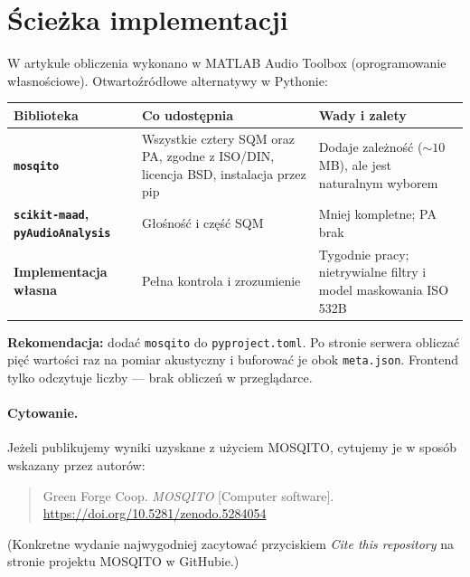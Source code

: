 \documentclass[11pt,a4paper]{article}
\begin{document}
\section{Ścieżka implementacji}

W artykule obliczenia wykonano w MATLAB Audio Toolbox (oprogramowanie
własnościowe). Otwartoźródłowe alternatywy w Pythonie:

\begin{center}
\renewcommand{\arraystretch}{1.2}
\begin{tabular}{>{\bfseries}l p{6.5cm} p{4.5cm}}
  \toprule
  Biblioteka & Co udostępnia & Wady i zalety \\
  \midrule
  \texttt{mosqito} &
    Wszystkie cztery SQM oraz PA, zgodne z ISO/DIN, licencja BSD,
    instalacja przez pip &
    Dodaje zależność ($\sim 10$\,MB), ale jest naturalnym wyborem \\

  \texttt{scikit-maad}, \texttt{pyAudioAnalysis} &
    Głośność i część SQM &
    Mniej kompletne; PA brak \\

  Implementacja własna &
    Pełna kontrola i zrozumienie &
    Tygodnie pracy; nietrywialne filtry i model maskowania
    ISO 532B \\
  \bottomrule
\end{tabular}
\end{center}

\noindent
\textbf{Rekomendacja:} dodać \texttt{mosqito} do \texttt{pyproject.toml}.
Po stronie serwera obliczać pięć wartości raz na pomiar akustyczny i
buforować je obok \texttt{meta.json}. Frontend tylko odczytuje liczby ---
brak obliczeń w przeglądarce.

\paragraph{Cytowanie.}
Jeżeli publikujemy wyniki uzyskane z użyciem MOSQITO, cytujemy je w sposób
wskazany przez autorów:
\begin{quote}
\small
Green Forge Coop. \textit{MOSQITO} [Computer software].
\href{https://doi.org/10.5281/zenodo.5284054}{https://doi.org/10.5281/zenodo.5284054}
\end{quote}
(Konkretne wydanie najwygodniej zacytować przyciskiem \emph{Cite this repository}
na stronie projektu MOSQITO w GitHubie.)
\end{document}

